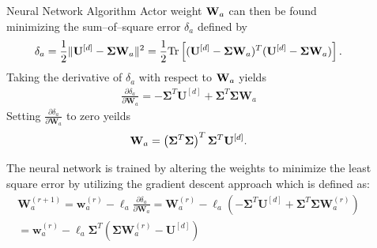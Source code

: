 \documentclass[final]{beamer}
\newlength{\sepwid}
\newlength{\onecolwid}
\begin{document}
\begin{frame}[t]
\begin{columns}[t]
\begin{column}{\onecolwid}
\begin{block}{Neural Network Algorithm}
Actor weight ${\bf W}_a$ can then be found minimizing the sum--of--square error $\delta_a$ defined by %
%
\begin{align*}
  \delta_a = \frac{1}{2}\|{\bf U}^{[d]} - \bm{\Sigma} {\bf W}_a\|^2  = \frac{1}{2}\mathrm{Tr}\left[({\bf U}^{[d]} - \bm{\Sigma} {\bf W}_a)^T({\bf U}^{[d]} - \bm{\Sigma} {\bf W}_a)\right].
\end{align*}
%
Taking the derivative of $\delta_a$ with respect to ${\bf W}_a$ yields 
%
\begin{align}
  \frac{\partial\delta_a}{\partial\mathbf{W}_a} = - \bm{\Sigma}^T\mathbf{U}^{[d]} + \bm{\Sigma}^T \bm{\Sigma}\mathbf{W}_a
  \label{eq:actorWeightsGradient}
\end{align}
%
Setting $\frac{\partial\delta_a}{\partial\mathbf{W}_a}$ to zero yeilds
\begin{align*}
  {\bf W}_a = \left(\bm{\Sigma}^T\bm{\Sigma}\right)^T\bm{\Sigma}^T{\bf U}^{[d]}.
\end{align*}
 
 The neural network is trained by altering the weights to minimize the least square error by utilizing the gradient descent approach which is defined as:
 \begin{multline}
  \mathbf{W}_a^{(r+1)} = \mathbf{w}_a^{(r)} - \ell_a\frac{\partial\delta_a}{\partial\mathbf{W}_a}= \mathbf{W}_a^{(r)} - \ell_a\left(-\bm{\Sigma}^T\mathbf{U}^{[d]} + \bm{\Sigma}^T \bm{\Sigma}\mathbf{W}_a^{(r)}\right)\\
  = \mathbf{w}_a^{(r)}-\ell_a \bm{\Sigma}^T\left(\bm{\Sigma}\mathbf{W}_a^{(r)} - \mathbf{U}^{[d]}\right)
  \label{eq:actorWeightUpdate}
\end{multline}


\vskip -2.5cm
\end{block}



\end{column} %

\begin{column}{\sepwid}\end{column}

\begin{column}{\onecolwid} %



\end{column}
\end{columns}
\end{frame}
\end{document}
